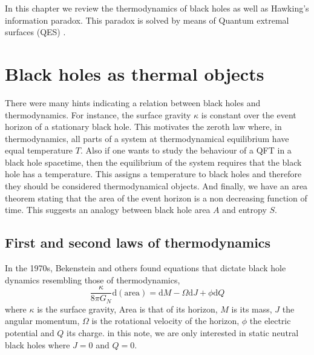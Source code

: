 In this chapter we review the thermodynamics of black holes as well as Hawking's information paradox. This paradox is solved by means of Quantum extremal surfaces (QES) \cite{almheiri2020entropy}.

\section{Black holes as thermal objects}

There were many hints indicating a relation between black holes and thermodynamics. For instance, the surface gravity $\kappa$ is constant over the event horizon of a stationary black hole. This motivates the zeroth law where, in thermodynamics, all parts of a system at thermodynamical equilibrium have equal temperature $T$. Also if one wants to study the behaviour of a QFT in a black hole spacetime, then the equilibrium of the system requires that the black hole has a temperature. This assigns a temperature to black holes and therefore they should be considered thermodynamical objects. And finally, we have an area theorem stating that the area of the event horizon is a non decreasing function of time. This suggests an analogy between black hole area $A$ and entropy $S$.

\subsection{First and second laws of thermodynamics}

In the 1970s, Bekenstein and others \cite{Bekenstein1972, PhysRevD.7.2333, PhysRevLett.25.1596} found equations that dictate black hole dynamics resembling those of thermodynamics,
\begin{equation}\label{1st law v1}
    \frac{\kappa}{8\pi G_N}\text{d}\left(\text{area}\right) = \text{d}M -\Omega\text{d}J + \phi\text{d}Q
\end{equation}
where $\kappa$ is the surface gravity, Area is that of its horizon, $M$ is its mass, $J$ the angular momentum, $\Omega$ is the rotational velocity of the horizon, $\phi$ the electric potential and $Q$ its charge. in this note, we are only interested in static neutral black holes where $J=0$ and $Q=0$.

